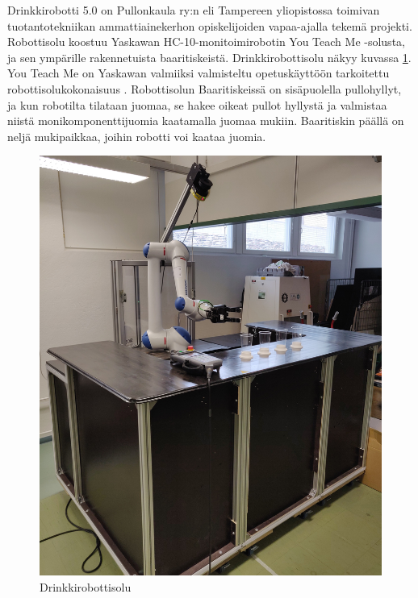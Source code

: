 Drinkkirobotti 5.0 on Pullonkaula ry:n eli Tampereen yliopistossa toimivan tuotantotekniikan ammattiainekerhon opiskelijoiden vapaa-ajalla tekemä projekti. Robottisolu koostuu Yaskawan HC-10-monitoimirobotin You Teach Me \hyp{}solusta, ja sen ympärille rakennetuista baaritiskeistä. Drinkkirobottisolu näkyy kuvassa \ref{fig:drinkkirobotti}. You Teach Me on Yaskawan valmiiksi valmisteltu opetuskäyttöön tarkoitettu robottisolukokonaisuus \cite{Yaskawa2017}. Robottisolun  Baaritiskeissä on sisäpuolella pullohyllyt, ja kun robotilta tilataan juomaa, se hakee oikeat pullot hyllystä ja valmistaa niistä monikomponenttijuomia kaatamalla juomaa mukiin. Baaritiskin päällä on neljä mukipaikkaa, joihin robotti voi kaataa juomia.

\begin{figure}[h]
\begin{center}
\includegraphics[scale=0.07]{img/drinkkirobotti.jpg}   %
\end{center}
\caption{Drinkkirobottisolu}
\label{fig:drinkkirobotti}
\end{figure}

